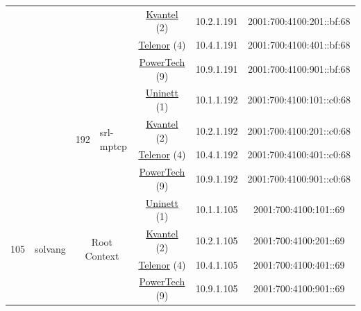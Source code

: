 \begin{small}
\begin{center}
\begin{longtable}{|c|c|c|c|c|c|c|c|}
  &  &  &  & \multicolumn{2}{|c|}{\tiny{\href{http://kvantel.no}{Kvantel} (2)}} & \tiny{10.2.1.191} & \tiny{2001:700:4100:201::bf:68} \\* \cline{5-5}\cline{6-6}\cline{7-7}\cline{8-8}
  &  &  &  & \multicolumn{2}{|c|}{\tiny{\href{https://www.telenor.no}{Telenor} (4)}} & \tiny{10.4.1.191} & \tiny{2001:700:4100:401::bf:68} \\* \cline{5-5}\cline{6-6}\cline{7-7}\cline{8-8}
  &  &  &  & \multicolumn{2}{|c|}{\tiny{\href{http://www.powertech.no}{PowerTech} (9)}} & \tiny{10.9.1.191} & \tiny{2001:700:4100:901::bf:68} \\* \cline{3-3}\cline{4-4}\cline{5-5}\cline{6-6}\cline{7-7}\cline{8-8}
  &  & \multirow{4}{*}{\tiny{192}} & \multicolumn{1}{|l|}{\multirow{4}{*}{\tiny{srl-mptcp}}} & \multicolumn{2}{|c|}{\tiny{\href{https://www.uninett.no}{Uninett} (1)}} & \tiny{10.1.1.192} & \tiny{2001:700:4100:101::c0:68} \\* \cline{5-5}\cline{6-6}\cline{7-7}\cline{8-8}
  &  &  &  & \multicolumn{2}{|c|}{\tiny{\href{http://kvantel.no}{Kvantel} (2)}} & \tiny{10.2.1.192} & \tiny{2001:700:4100:201::c0:68} \\* \cline{5-5}\cline{6-6}\cline{7-7}\cline{8-8}
  &  &  &  & \multicolumn{2}{|c|}{\tiny{\href{https://www.telenor.no}{Telenor} (4)}} & \tiny{10.4.1.192} & \tiny{2001:700:4100:401::c0:68} \\* \cline{5-5}\cline{6-6}\cline{7-7}\cline{8-8}
  &  &  &  & \multicolumn{2}{|c|}{\tiny{\href{http://www.powertech.no}{PowerTech} (9)}} & \tiny{10.9.1.192} & \tiny{2001:700:4100:901::c0:68} \\ \hline
 \multirow{40}{*}{\tiny{105}} & \multicolumn{1}{|l|}{\multirow{40}{*}{\tiny{solvang}}} & \multicolumn{2}{|c|}{\multirow{4}{*}{\tiny{Root Context}}} & \multicolumn{2}{|c|}{\tiny{\href{https://www.uninett.no}{Uninett} (1)}} & \tiny{10.1.1.105} & \tiny{2001:700:4100:101::69} \\* \cline{5-5}\cline{6-6}\cline{7-7}\cline{8-8}
  &  & \multicolumn{2}{|c|}{} & \multicolumn{2}{|c|}{\tiny{\href{http://kvantel.no}{Kvantel} (2)}} & \tiny{10.2.1.105} & \tiny{2001:700:4100:201::69} \\* \cline{5-5}\cline{6-6}\cline{7-7}\cline{8-8}
  &  & \multicolumn{2}{|c|}{} & \multicolumn{2}{|c|}{\tiny{\href{https://www.telenor.no}{Telenor} (4)}} & \tiny{10.4.1.105} & \tiny{2001:700:4100:401::69} \\* \cline{5-5}\cline{6-6}\cline{7-7}\cline{8-8}
  &  & \multicolumn{2}{|c|}{} & \multicolumn{2}{|c|}{\tiny{\href{http://www.powertech.no}{PowerTech} (9)}} & \tiny{10.9.1.105} & \tiny{2001:700:4100:901::69} \\* \cline{3-3}\cline{4-4}\cline{5-5}\cline{6-6}\cline{7-7}\cline{8-8}

\end{longtable}
\end{center}
\end{small}

